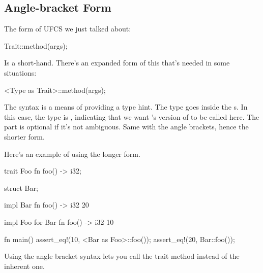 \subsection*{Angle-bracket Form}

The form of UFCS we just talked about:

\begin{rustc}
Trait::method(args);
\end{rustc}

Is a short-hand. There's an expanded form of this that's needed in some situations:

\begin{rustc}
<Type as Trait>::method(args);
\end{rustc}

The \code{<>::} syntax is a means of providing a type hint. The type goes inside the \code{<>}s. In this case, the type is 
, indicating that we want 's version of  to be called here. The  part 
is optional if it's not ambiguous. Same with the angle brackets, hence the shorter form.

\blank

Here's an example of using the longer form.

\begin{rustc}
trait Foo {
    fn foo() -> i32;
}

struct Bar;

impl Bar {
    fn foo() -> i32 {
        20
    }
}

impl Foo for Bar {
    fn foo() -> i32 {
        10
    }
}

fn main() {
    assert_eq!(10, <Bar as Foo>::foo());
    assert_eq!(20, Bar::foo());
}
\end{rustc}

Using the angle bracket syntax lets you call the trait method instead of the inherent one.
